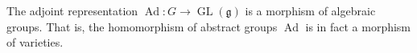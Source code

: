 The adjoint representation $\operatorname{Ad}: G \to \operatorname{GL}(\mathfrak{g})$ is a morphism of algebraic groups. That is, the homomorphism of abstract groups $\operatorname{Ad}$ is in fact a morphism of varieties.
